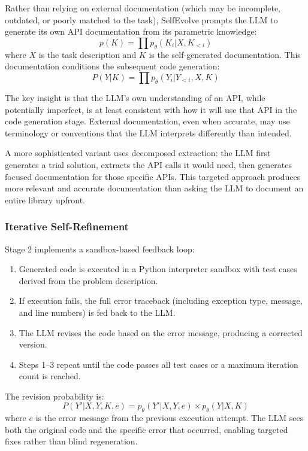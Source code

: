 Rather than relying on external documentation (which may be incomplete, outdated, or poorly matched to the task), SelfEvolve prompts the LLM to generate its own API documentation from its parametric knowledge:
\begin{equation}
p(K) = \prod p_\theta(K_i | X, K_{<i})
\end{equation}
where $X$ is the task description and $K$ is the self-generated documentation. This documentation conditions the subsequent code generation:
\begin{equation}
P(Y|K) = \prod p_\theta(Y_i | Y_{<i}, X, K)
\end{equation}

The key insight is that the LLM's own understanding of an API, while potentially imperfect, is at least consistent with how it will use that API in the code generation stage. External documentation, even when accurate, may use terminology or conventions that the LLM interprets differently than intended.

A more sophisticated variant uses decomposed extraction: the LLM first generates a trial solution, extracts the API calls it would need, then generates focused documentation for those specific APIs. This targeted approach produces more relevant and accurate documentation than asking the LLM to document an entire library upfront.

\subsubsection{Iterative Self-Refinement}

Stage 2 implements a sandbox-based feedback loop:
\begin{enumerate}
\item Generated code is executed in a Python interpreter sandbox with test cases derived from the problem description.
\item If execution fails, the full error traceback (including exception type, message, and line numbers) is fed back to the LLM.
\item The LLM revises the code based on the error message, producing a corrected version.
\item Steps 1--3 repeat until the code passes all test cases or a maximum iteration count is reached.
\end{enumerate}

The revision probability is:
\begin{equation}
P(Y'|X,Y,K,e) = p_\theta(Y'|X,Y,e) \times p_\theta(Y|X,K)
\end{equation}
where $e$ is the error message from the previous execution attempt. The LLM sees both the original code and the specific error that occurred, enabling targeted fixes rather than blind regeneration.

